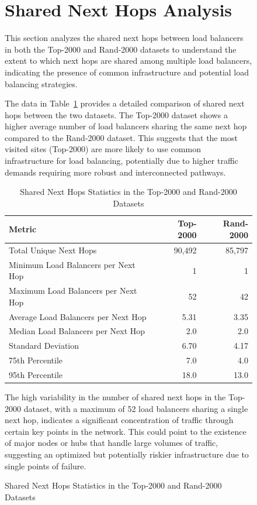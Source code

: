 \documentclass[12pt]{cwru_thesis}
\begin{document}
\begin{figure}[h!]
\newpage



\section{Shared Next Hops Analysis}

This section analyzes the shared next hops between load balancers in both the Top-2000 and Rand-2000 datasets to understand the extent to which next hops are shared among multiple load balancers, indicating the presence of common infrastructure and potential load balancing strategies.

The data in Table~\ref{tab:shared_next_hops_summary} provides a detailed comparison of shared next hops between the two datasets. The Top-2000 dataset shows a higher average number of load balancers sharing the same next hop compared to the Rand-2000 dataset. This suggests that the most visited sites (Top-2000) are more likely to use common infrastructure for load balancing, potentially due to higher traffic demands requiring more robust and interconnected pathways. 

\begin{table}[h!]
    \centering
    \begin{tabular}{|l|r|r|}
        \hline
        \textbf{Metric} & \textbf{Top-2000} & \textbf{Rand-2000} \\
        \hline
        Total Unique Next Hops & 90,492 & 85,797 \\
        Minimum Load Balancers per Next Hop & 1 & 1 \\
        Maximum Load Balancers per Next Hop & 52 & 42 \\
        Average Load Balancers per Next Hop & 5.31 & 3.35 \\
        Median Load Balancers per Next Hop & 2.0 & 2.0 \\
        Standard Deviation & 6.70 & 4.17 \\
        75th Percentile & 7.0 & 4.0 \\
        95th Percentile & 18.0 & 13.0 \\
        \hline
    \end{tabular}
    \caption{Shared Next Hops Statistics in the Top-2000 and Rand-2000 Datasets}
    \label{tab:shared_next_hops_summary}
\end{table}

The high variability in the number of shared next hops in the Top-2000 dataset, with a maximum of 52 load balancers sharing a single next hop, indicates a significant concentration of traffic through certain key points in the network. This could point to the existence of major nodes or hubs that handle large volumes of traffic, suggesting an optimized but potentially riskier infrastructure due to single points of failure.


\end{figure}
\end{document}
